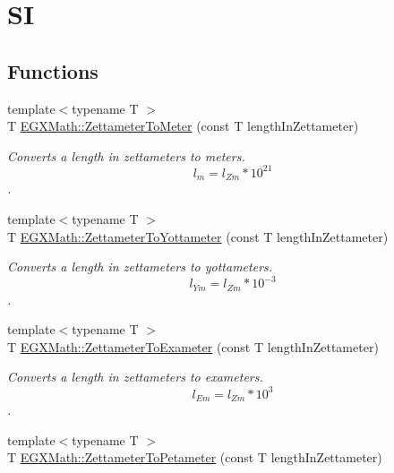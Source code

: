 \hypertarget{group___e_g_x_math-_conversions-_length_conversions-_zettameter-_s_i}{}\section{SI}
\label{group___e_g_x_math-_conversions-_length_conversions-_zettameter-_s_i}
\subsection*{Functions}
\begin{DoxyCompactItemize}
\item 
{\footnotesize template$<$typename T $>$ }\\T \mbox{\hyperlink{group___e_g_x_math-_conversions-_length_conversions-_zettameter-_s_i_ga4965fffbfd10b795231942d8de4e1f2d}{E\+G\+X\+Math\+::\+Zettameter\+To\+Meter}} (const T length\+In\+Zettameter)
\begin{DoxyCompactList}\small\item\em Converts a length in zettameters to meters. \[ l_{m}=l_{Zm} * 10^{21} \]. \end{DoxyCompactList}\item 
{\footnotesize template$<$typename T $>$ }\\T \mbox{\hyperlink{group___e_g_x_math-_conversions-_length_conversions-_zettameter-_s_i_ga50b4ccf902ce36f4519ce580bf2234d4}{E\+G\+X\+Math\+::\+Zettameter\+To\+Yottameter}} (const T length\+In\+Zettameter)
\begin{DoxyCompactList}\small\item\em Converts a length in zettameters to yottameters. \[ l_{Ym}=l_{Zm} * 10^{-3} \]. \end{DoxyCompactList}\item 
{\footnotesize template$<$typename T $>$ }\\T \mbox{\hyperlink{group___e_g_x_math-_conversions-_length_conversions-_zettameter-_s_i_ga7d9638e3c012b4ff3ad3dc0e0f0393b2}{E\+G\+X\+Math\+::\+Zettameter\+To\+Exameter}} (const T length\+In\+Zettameter)
\begin{DoxyCompactList}\small\item\em Converts a length in zettameters to exameters. \[ l_{Em}=l_{Zm} * 10^{3} \]. \end{DoxyCompactList}\item 
{\footnotesize template$<$typename T $>$ }\\T \mbox{\hyperlink{group___e_g_x_math-_conversions-_length_conversions-_zettameter-_s_i_ga85af5c37065cd355ac23b12a4f7b16f5}{E\+G\+X\+Math\+::\+Zettameter\+To\+Petameter}} (const T length\+In\+Zettameter)

\end{DoxyCompactItemize}
